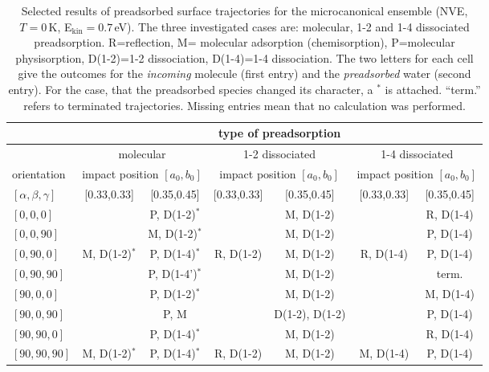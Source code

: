 \documentclass[11pt,DIV=13,BCOR=5mm,a4paper,headinclude]{scrbook}
\begin{document}
\begin{table}[!h]
  \centering
  \caption{Selected results of preadsorbed surface trajectories for the microcanonical ensemble (NVE, $T=0\,$K, E$_\textrm{kin}=0.7\,$eV).
The three investigated cases are: molecular, 1-2 and 1-4 dissociated preadsorption.
R=reflection, M= molecular adsorption (chemisorption), P=molecular physisorption, D(1-2)=1-2 dissociation, D(1-4)=1-4 dissociation.
The two letters for each cell give the outcomes for the \textit{incoming} molecule (first entry) and the \textit{preadsorbed} water (second entry).
For the case, that the preadsorbed species changed its character, a $^*$ is attached.
``term.'' refers to terminated trajectories.
Missing entries mean that no calculation was performed.}
\hspace*{-1cm}
 \begin{tabular}{l|cc|cc|cc}
 \toprule
               & \multicolumn{6}{c}{type of preadsorption } \\\hline
               & \multicolumn{2}{c|}{molecular} & \multicolumn{2}{c|}{1-2 dissociated} & \multicolumn{2}{c}{1-4 dissociated} \\\hline
    orientation& \multicolumn{2}{c|}{impact position $[a_0,b_0]$} & \multicolumn{2}{c|}{impact position $[a_0,b_0]$} & \multicolumn{2}{c}{impact position $[a_0,b_0]$} \\
    $[\alpha,\beta,\gamma]$ & [0.33,0.33] & [0.35,0.45] & [0.33,0.33] & [0.35,0.45] & [0.33,0.33] & [0.35,0.45] \\
    \midrule
   $[0,0,0]$    &          & P, D(1-2)$^*$  &  & M, D(1-2) &  & R, D(1-4) \\
   $[0,0,90]$   &          & M, D(1-2)$^*$  &  & M, D(1-2) &  & P, D(1-4) \\
   $[0,90,0]$   & M, D(1-2)$^*$ & P, D(1-4)$^*$  & R, D(1-2) & M, D(1-2) & R, D(1-4) & P, D(1-4) \\
   $[0,90,90]$  &          & P, D(1-4')$^*$ &  & M, D(1-2) &          & term. \\
   $[90,0,0]$   &          & P, D(1-2)$^*$  &  & M, D(1-2) &  & M, D(1-4) \\
   $[90,0,90]$  &          & P, M      &  & D(1-2), D(1-2) &  & P, D(1-4) \\
   $[90,90,0]$  &          & P, D(1-4)$^*$  &  & M, D(1-2) &  & R, D(1-4) \\
   $[90,90,90]$ & M, D(1-2)$^*$ & P, D(1-4)$^*$  & R, D(1-2) & M, D(1-2) & M, D(1-4) & P, D(1-4)
\\\hline
  \end{tabular}
  \label{tab:preads_mic}
\end{table}
\\
\end{document}
